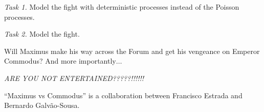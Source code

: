 \hfill

\emph{Task 1. } Model the fight with deterministic processes instead of the Poisson processes.

\emph{Task 2. } Model the fight.









\vfill

Will Maximus make his way across the Forum and get his vengeance on Emperor Commodus? And more importantly$\ldots$

\begin{center}
\emph{ARE YOU NOT ENTERTAINED?????!!!!!!	}
\end{center}

\vfill

%



\hfill ``Maximus vs Commodus'' is a collaboration between Francisco Estrada and Bernardo Galv\~ao-Sousa.

\begin{noexercises}
\end{noexercises}
